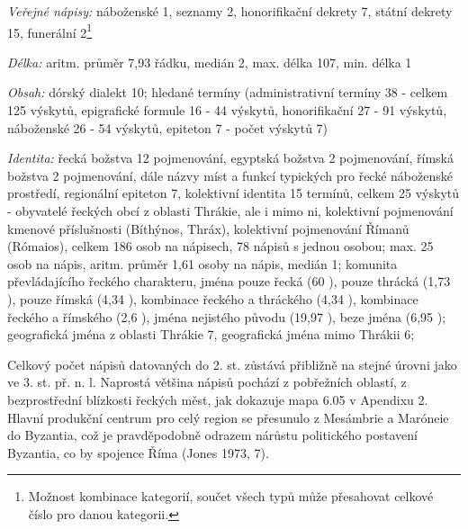 {\em Veřejné nápisy:} náboženské 1, seznamy 2, honorifikační dekrety 7, státní dekrety 15, funerální 2\footnote{Možnost kombinace kategorií, součet všech typů může přesahovat celkové číslo pro danou kategorii.}

{\em Délka:} aritm. průměr 7,93 řádku, medián 2, max. délka 107, min. délka 1

{\em Obsah:} dórský dialekt 10; hledané termíny (administrativní termíny 38 - celkem 125 výskytů, epigrafické formule 16 - 44 výskytů, honorifikační 27 - 91 výskytů, náboženské 26 - 54 výskytů, epiteton 7 - počet výskytů 7)

{\em Identita:} řecká božstva 12 pojmenování, egyptská božstva 2 pojmenování, římská božstva 2 pojmenování, dále názvy míst a funkcí typických pro řecké náboženské prostředí, regionální epiteton 7, kolektivní identita 15 termínů, celkem 25 výskytů - obyvatelé řeckých obcí z oblasti Thrákie, ale i mimo ni, kolektivní pojmenování kmenové příslušnosti (Bíthýnos, Thráx), kolektivní pojmenování Římanů (Rómaios), celkem 186 osob na nápisech, 78 nápisů s jednou osobou; max. 25 osob na nápis, aritm. průměr 1,61 osoby na nápis, medián 1; komunita převládajícího řeckého charakteru, jména pouze řecká (60 ), pouze thrácká (1,73 ), pouze římská (4,34 ), kombinace řeckého a thráckého (4,34 ), kombinace řeckého a římského (2,6 ), jména nejistého původu (19,97 ), beze jména (6,95 ); geografická jména z oblasti Thrákie 7, geografická jména mimo Thrákii 6;

\NC\AR
\HL
\HL
\stoptable

Celkový počet nápisů datovaných do 2. st. zůstává přibližně na stejné úrovni jako ve 3. st. př. n. l. Naprostá většina nápisů pochází z pobřežních oblastí, z bezprostřední blízkosti řeckých měst, jak dokazuje mapa 6.05 v Apendixu 2. Hlavní produkční centrum pro celý region se přesunulo z Mesámbrie a Maróneie do Byzantia, což je pravděpodobně odrazem nárůstu politického postavení Byzantia, co by spojence Říma (Jones 1973, 7).

